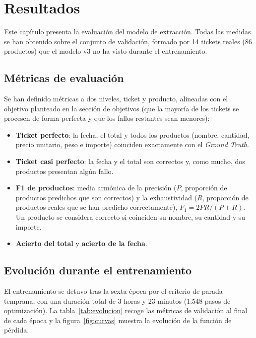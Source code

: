 \chapter{Resultados}
\label{ch:resultados}

Este capítulo presenta la evaluación del modelo de extracción. Todas las medidas se han obtenido sobre el conjunto de validación, formado por 14 tickets reales (86 productos) que el modelo v3 no ha visto durante el entrenamiento.

\section{Métricas de evaluación}
Se han definido métricas a dos niveles, ticket y producto, alineadas con el objetivo planteado en la sección de objetivos (que la mayoría de los tickets se procesen de forma perfecta y que los fallos restantes sean menores):

\begin{itemize}
    \item \textbf{Ticket perfecto}: la fecha, el total y todos los productos (nombre, cantidad, precio unitario, peso e importe) coinciden exactamente con el \textit{Ground Truth}.
    \item \textbf{Ticket casi perfecto}: la fecha y el total son correctos y, como mucho, dos productos presentan algún fallo.
    \item \textbf{F1 de productos}: media armónica de la precisión ($P$, proporción de productos predichos que son correctos) y la exhaustividad ($R$, proporción de productos reales que se han predicho correctamente), $F_1 = 2PR/(P+R)$. Un producto se considera correcto si coinciden su nombre, su cantidad y su importe.
    \item \textbf{Acierto del total} y \textbf{acierto de la fecha}.
\end{itemize}

\section{Evolución durante el entrenamiento}
El entrenamiento se detuvo tras la sexta época por el criterio de parada temprana, con una duración total de 3 horas y 23 minutos (1.548 pasos de optimización). La tabla~\ref{tab:evolucion} recoge las métricas de validación al final de cada época y la figura~\ref{fig:curvas} muestra la evolución de la función de pérdida.

